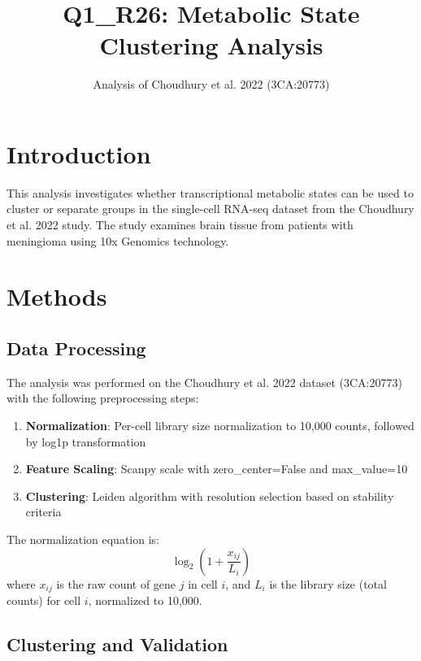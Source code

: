 \documentclass[11pt, a4paper]{article}
\title{\textbf{Q1\_R26: Metabolic State Clustering Analysis}}
\author{Analysis of Choudhury et al. 2022 (3CA:20773)}
\date{}
\begin{document}
\sloppy

\maketitle

\section{Introduction}

This analysis investigates whether transcriptional metabolic states can be used to cluster or separate groups in the single-cell RNA-seq dataset from the Choudhury et al. 2022 study. The study examines brain tissue from patients with meningioma using 10x Genomics technology.

\section{Methods}

\subsection{Data Processing}

The analysis was performed on the Choudhury et al. 2022 dataset (3CA:20773) with the following preprocessing steps:

\begin{enumerate}
    \item \textbf{Normalization}: Per-cell library size normalization to 10,000 counts, followed by log1p transformation
    \item \textbf{Feature Scaling}: Scanpy scale with zero\_center=False and max\_value=10
    \item \textbf{Clustering}: Leiden algorithm with resolution selection based on stability criteria
\end{enumerate}

The normalization equation is:
\begin{equation}
\label{eq:normalize}
\log_2\left(1 + \frac{x_{ij}}{L_i}\right)
\end{equation}
where $x_{ij}$ is the raw count of gene $j$ in cell $i$, and $L_i$ is the library size (total counts) for cell $i$, normalized to 10,000.

\subsection{Clustering and Validation}
\end{document}
